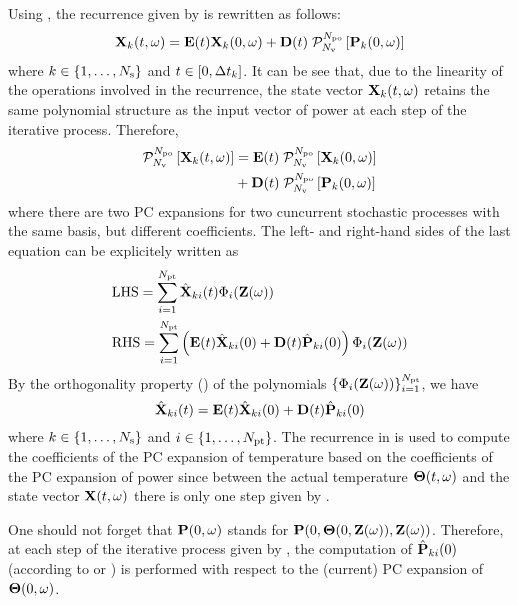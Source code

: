 Using , the recurrence given by  is rewritten as follows:
\[
  \vX_k(\t, \o) = \mE(\t) \vX_k(0, \o) + \mD(\t) \; \oPC{\vars}{\pcorder}{\vP_k(0, \o)}
\]
where $k \in \{ 1, \dotsc, N_\text{s} \}$ and $t \in [0, \Delta t_k]$. It can be see that, due to the linearity of the operations involved in the recurrence, the state vector $\mathbf{X}_k(t, \omega)$ retains the same polynomial structure as the input vector of power at each step of the iterative process. Therefore,
\begin{align*}
  \oPC{\vars}{\pcorder}{\vX_k(\t, \o)} & = \mE(\t) \; \oPC{\vars}{\pcorder}{\vX_k(0, \o)} \\
  & {} + \mD(\t) \; \oPC{\vars}{\pcorder}{\vP_k(0, \o)}
\end{align*}
where there are two PC expansions for two cuncurrent stochastic processes with the same basis, but different coefficients. The left- and right-hand sides of the last equation can be explicitely written as
\begin{align*}
  & \text{LHS} = \sum_{i = 1}^{\pcterms} \pcc{\vX}_{ki}(\t) \pcb_i(\vZ(\o)) \\
  & \text{RHS} = \sum_{i = 1}^{\pcterms} \left( \mE(\t) \pcc{\vX}_{ki}(0) + \mD(\t) \pcc{\vP}_{ki}(0) \right) \pcb_i(\vZ(\o))
\end{align*}
By the orthogonality property () of the polynomials $\{ \Phi_i(\mathbf{Z}(\omega)) \}_{i = 1}^{{N_\text{pt}}}$, we have
\begin{equation} \elabel{pc-recurrence}
  \pcc{\vX}_{ki}(\t) = \mE(\t) \pcc{\vX}_{ki}(0) + \mD(\t) \pcc{\vP}_{ki}(0)
\end{equation}
where $k \in \{ 1, \dots, N_\text{s} \}$ and $i \in \{ 1, \dotsc, {N_\text{pt}} \}$. The recurrence in  is used to compute the coefficients of the PC expansion of temperature based on the coefficients of the PC expansion of power since between the actual temperature ${\boldsymbol\Theta}(t, \omega)$ and the state vector $\mathbf{X}(t, \omega)$ there is only one step given by .

One should not forget that $\mathbf{P}(0, \omega)$ stands for $\mathbf{P}(0, {\boldsymbol\Theta}(0, \mathbf{Z}(\omega)), \mathbf{Z}(\omega))$. Therefore, at each step of the iterative process given by , the computation of $\hat{\mathbf{P}}_{ki}(0)$ (according to  or ) is performed with respect to the (current) PC expansion of ${\boldsymbol\Theta}(0, \omega)$.
